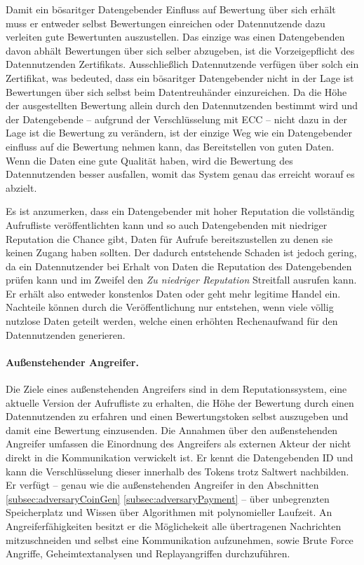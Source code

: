\documentclass[
	fontsize=12pt,
	headings=small,
	parskip=half,           %
	bibliography=totoc,
	numbers=noenddot,       %
	open=any,               %
]{scrreprt}
\begin{document}
Damit ein bösaritger Datengebender Einfluss auf Bewertung über sich erhält muss er entweder selbst Bewertungen einreichen oder Datennutzende dazu verleiten gute Bewertunten auszustellen. Das einzige was einen Datengebenden davon abhält  Bewertungen über sich selber abzugeben, ist die Vorzeigepflicht des Datennutzenden Zertifikats. Ausschließlich Datennutzende verfügen über solch ein Zertifikat, was bedeuted, dass ein bösaritger Datengebender nicht in der Lage ist Bewertungen über sich selbst beim Datentreuhänder einzureichen. Da die Höhe der ausgestellten Bewertung allein durch den Datennutzenden bestimmt wird und der Datengebende -- aufgrund der Verschlüsselung mit ECC -- nicht dazu in der Lage ist die Bewertung zu verändern, ist der einzige Weg wie ein Datengebender einfluss auf die Bewertung nehmen kann, das Bereitstellen von guten Daten. Wenn die Daten eine gute Qualität haben, wird die Bewertung des Datennutzenden besser ausfallen, womit das System genau das erreicht worauf es abzielt.

Es ist anzumerken, dass ein Datengebender mit hoher Reputation die vollständig Aufrufliste veröffentlichten kann und so auch Datengebenden mit niedriger Reputation die Chance gibt, Daten für Aufrufe bereitszustellen zu denen sie keinen Zugang haben sollten. Der dadurch entstehende Schaden ist jedoch gering, da ein Datennutzender bei Erhalt von Daten die Reputation des Datengebenden prüfen kann und im Zweifel den \textit{Zu niedriger Reputation} Streitfall ausrufen kann. Er erhält also entweder konstenlos Daten oder geht mehr legitime Handel ein. Nachteile können durch die Veröffentlichung nur entstehen, wenn viele völlig nutzlose Daten geteilt werden, welche einen erhöhten Rechenaufwand für den Datennutzenden generieren.

\paragraph{Außenstehender Angreifer.}
Die Ziele eines außenstehenden Angreifers sind in dem Reputationssystem, eine aktuelle Version der Aufrufliste zu erhalten, die Höhe der Bewertung durch einen Datennutzenden zu erfahren und einen Bewertungstoken selbst auszugeben und damit eine Bewertung einzusenden. Die Annahmen über den außenstehenden Angreifer umfassen die Einordnung des Angreifers als externen Akteur der nicht direkt in die Kommunikation verwickelt ist. Er kennt die Datengebenden ID und kann die Verschlüsselung dieser innerhalb des Tokens trotz Saltwert nachbilden. Er verfügt -- genau wie die außenstehenden Angreifer in den Abschnitten \ref{subsec:adversaryCoinGen} \ref{subsec:adversaryPayment} -- über unbegrenzten Speicherplatz und Wissen über Algorithmen mit polynomieller Laufzeit. An Angreiferfähigkeiten besitzt er die Möglichekeit alle übertragenen Nachrichten mitzuschneiden und selbst eine Kommunikation aufzunehmen, sowie Brute Force Angriffe, Geheimtextanalysen und Replayangriffen durchzuführen.
\end{document}
